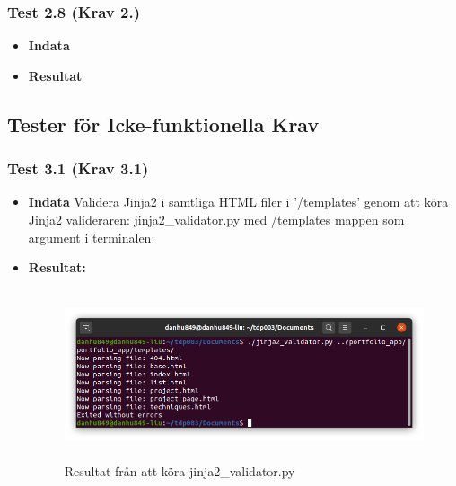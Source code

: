 \documentclass{TDP003mall}
\begin{document}
\subsubsection*{Test 2.8 (Krav 2.)}
\begin{itemize}
\item[]\textbf{Indata}
\item[]\textbf{Resultat} 
\end{itemize}






\subsection{Tester för Icke-funktionella Krav}
\subsubsection*{Test 3.1 (Krav 3.1)}
\begin{itemize}
\item[]\textbf{Indata} Validera Jinja2 i samtliga HTML filer i '/templates' genom att köra Jinja2 valideraren: jinja2\_validator.py med /templates mappen som argument i terminalen:
\item[]\textbf{Resultat:}
\begin{figure}[h!]
\centerline{\includegraphics[width=\textwidth, height=5cm]{../Pictures/jinja2_validated.png}}
\caption{Resultat från att köra jinja2\_validator.py\label{fig:}}
\end{figure}
\end{itemize}
\end{document}

